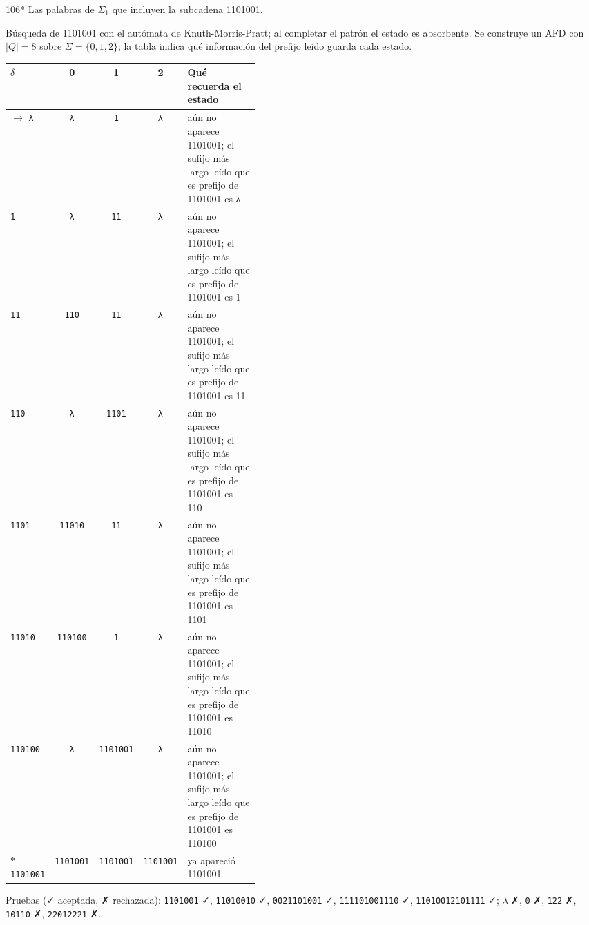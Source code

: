 \documentclass[11pt]{article}
\begin{document}
\begin{ejercicio}{106}{*}
Las palabras de $\Sigma_1$ que incluyen la subcadena 1101001.
\end{ejercicio}
\proc Búsqueda de 1101001 con el autómata de Knuth-Morris-Pratt; al completar el patrón el estado es absorbente. Se construye un AFD con $|Q| = 8$ sobre $\Sigma = \{0, 1, 2\}$; la tabla indica qué información del prefijo leído guarda cada estado.
\begin{center}\small\begin{tabular}{lcccp{0.42\linewidth}}\toprule
$\delta$ & 0 & 1 & 2 & Qué recuerda el estado \\\midrule
$\to$ \texttt{λ} & \texttt{λ} & \texttt{1} & \texttt{λ} & aún no aparece 1101001; el sufijo más largo leído que es prefijo de 1101001 es λ \\
 \texttt{1} & \texttt{λ} & \texttt{11} & \texttt{λ} & aún no aparece 1101001; el sufijo más largo leído que es prefijo de 1101001 es 1 \\
 \texttt{11} & \texttt{110} & \texttt{11} & \texttt{λ} & aún no aparece 1101001; el sufijo más largo leído que es prefijo de 1101001 es 11 \\
 \texttt{110} & \texttt{λ} & \texttt{1101} & \texttt{λ} & aún no aparece 1101001; el sufijo más largo leído que es prefijo de 1101001 es 110 \\
 \texttt{1101} & \texttt{11010} & \texttt{11} & \texttt{λ} & aún no aparece 1101001; el sufijo más largo leído que es prefijo de 1101001 es 1101 \\
 \texttt{11010} & \texttt{110100} & \texttt{1} & \texttt{λ} & aún no aparece 1101001; el sufijo más largo leído que es prefijo de 1101001 es 11010 \\
 \texttt{110100} & \texttt{λ} & \texttt{1101001} & \texttt{λ} & aún no aparece 1101001; el sufijo más largo leído que es prefijo de 1101001 es 110100 \\
$*$ \texttt{1101001} & \texttt{1101001} & \texttt{1101001} & \texttt{1101001} & ya apareció 1101001 \\
\bottomrule\end{tabular}\end{center}
Pruebas (✓ aceptada, ✗ rechazada): \texttt{1101001} ✓, \texttt{11010010} ✓, \texttt{0021101001} ✓, \texttt{111101001110} ✓, \texttt{11010012101111} ✓; $\lambda$ ✗, \texttt{0} ✗, \texttt{122} ✗, \texttt{10110} ✗, \texttt{22012221} ✗.
\end{document}
